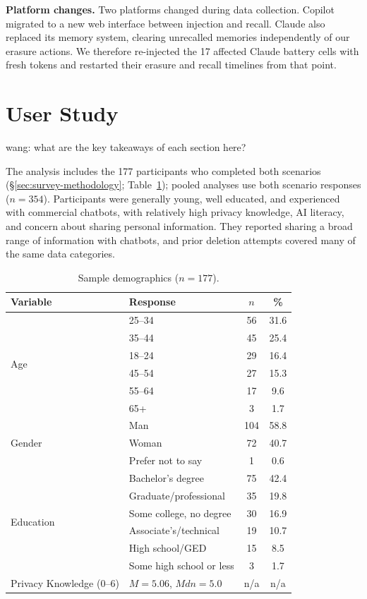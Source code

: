 \documentclass[conference,compsoc]{IEEEtran}
\newcommand{\xw}[1] {{\color{red}wang: #1}}
\begin{document}
\textbf{Platform changes.} Two platforms changed during data collection. Copilot migrated to a new web interface between injection and recall. Claude also replaced its memory system, clearing unrecalled memories independently of our erasure actions. We therefore re-injected the 17 affected Claude battery cells with fresh tokens and restarted their erasure and recall timelines from that point.

\section{User Study}

\xw{what are the key takeaways of each section here?}

\label{sec:sample-knowledge}

The analysis includes the 177 participants who completed both scenarios (\S\ref{sec:survey-methodology}; Table~\ref{tab:demographics}); pooled analyses use both scenario responses ($n=354$). Participants were generally young, well educated, and experienced with commercial chatbots, with relatively high privacy knowledge, AI literacy, and concern about sharing personal information. They reported sharing a broad range of information with chatbots, and prior deletion attempts covered many of the same data categories.

\begin{table}[t]
\centering
\caption{Sample demographics ($n=177$).}
\label{tab:demographics}
\small
\setlength{\tabcolsep}{3.5pt}
\begin{tabular}{llcc}
\toprule
Variable & Response & $n$ & \% \\
\midrule
\multirow{6}{*}{Age}
 & 25--34 & 56 & 31.6 \\
 & 35--44 & 45 & 25.4 \\
 & 18--24 & 29 & 16.4 \\
 & 45--54 & 27 & 15.3 \\
 & 55--64 & 17 & 9.6 \\
 & 65+    & 3  & 1.7 \\
\midrule
\multirow{3}{*}{Gender}
 & Man               & 104 & 58.8 \\
 & Woman             & 72  & 40.7 \\
 & Prefer not to say & 1   & 0.6 \\
\midrule
\multirow{6}{*}{Education}
 & Bachelor's degree      & 75 & 42.4 \\
 & Graduate/professional  & 35 & 19.8 \\
 & Some college, no degree & 30 & 16.9 \\
 & Associate's/technical  & 19 & 10.7 \\
 & High school/GED        & 15 & 8.5 \\
 & Some high school or less & 3 & 1.7 \\
\midrule
Privacy Knowledge (0--6) & $M=5.06$, $Mdn=5.0$ & n/a & n/a \\
\bottomrule
\end{tabular}
\end{table}
\end{document}
